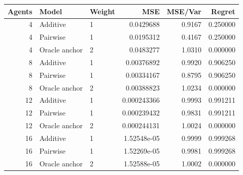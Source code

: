 \begin{tabular}{rllrrr}
\toprule
Agents & Model & Weight & MSE & MSE/Var & Regret \\
\midrule
4 & Additive & 1 & 0.0429688 & 0.9167 & 0.250000 \\
4 & Pairwise & 1 & 0.0195312 & 0.4167 & 0.250000 \\
4 & Oracle anchor & 2 & 0.0483277 & 1.0310 & 0.000000 \\
8 & Additive & 1 & 0.00376892 & 0.9920 & 0.906250 \\
8 & Pairwise & 1 & 0.00334167 & 0.8795 & 0.906250 \\
8 & Oracle anchor & 2 & 0.00388823 & 1.0234 & 0.000000 \\
12 & Additive & 1 & 0.000243366 & 0.9993 & 0.991211 \\
12 & Pairwise & 1 & 0.000239432 & 0.9831 & 0.991211 \\
12 & Oracle anchor & 2 & 0.000244131 & 1.0024 & 0.000000 \\
16 & Additive & 1 & 1.52548e-05 & 0.9999 & 0.999268 \\
16 & Pairwise & 1 & 1.52269e-05 & 0.9981 & 0.999268 \\
16 & Oracle anchor & 2 & 1.52588e-05 & 1.0002 & 0.000000 \\
\bottomrule
\end{tabular}
